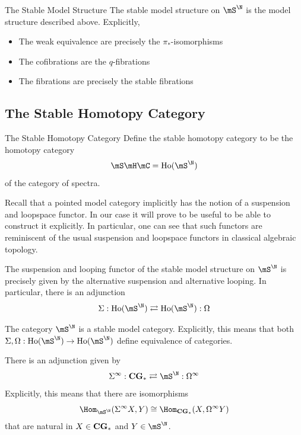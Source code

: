 \documentclass[a4paper]{article}
\begin{document}
\begin{defn}{The Stable Model Structure}{} The stable model structure on $\mS^\N$ is the model structure described above. Explicitly, 
\begin{itemize}
\item The weak equivalence are precisely the $\pi_\ast$-isomorphisms
\item The cofibrations are the $q$-fibrations
\item The fibrations are precisely the stable fibrations
\end{itemize}
\end{defn}

\subsection{The Stable Homotopy Category}
\begin{defn}{The Stable Homotopy Category}{} Define the stable homotopy category to be the homotopy category $$\mS\mH\mC=\text{Ho}(\mS^\N)$$ of the category of spectra. 
\end{defn}

Recall that a pointed model category implicitly has the notion of a suspension and loopspace functor. In our case it will prove to be useful to be able to construct it explicitly. In particular, one can see that such functors are reminiscent of the usual suspension and loopspace functors in classical algebraic topology. 

\begin{thm}{}{} The suspension and looping functor of the stable model structure on $\mS^\N$ is precisely given by the alternative suspension and alternative looping. In particular, there is an adjunction $$\Sigma:\text{Ho}(\mS^\N)\rightleftarrows\text{Ho}(\mS^\N):\Omega$$
\end{thm}

\begin{thm}{}{} The category $\mS^\N$ is a stable model category. Explicitly, this means that both $\Sigma,\Omega:\text{Ho}(\mS^\N)\to\text{Ho}(\mS^\N)$ define equivalence of categories. 
\end{thm}

\begin{thm}{}{} There is an adjunction given by $$\Sigma^\infty:\bold{CG}_\ast\rightleftarrows\mS^\N :\Omega^\infty$$ Explicitly, this means that there are isomorphisms $$\Hom_{\mS^\N }(\Sigma^\infty X,Y)\cong\Hom_{\bold{CG}_\ast}(X,\Omega^\infty Y)$$ that are natural in $X\in\bold{CG}_\ast$ and $Y\in\mS^\N $. 
\end{thm}
\end{document}
